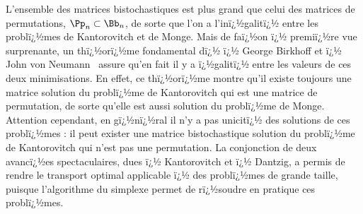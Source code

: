 
L'ensemble des matrices bistochastiques est plus grand que celui des matrices de permutations, $\Pp_n \subset \Bb_n$, de sorte que l'on a l'inï¿½galitï¿½ 
entre les problï¿½mes de Kantorovitch et de Monge. Mais de faï¿½on ï¿½ premiï¿½re vue surprenante, un thï¿½orï¿½me fondamental dï¿½ ï¿½ George Birkhoff et ï¿½ John von Neumann~\cite{birkhoff,von1953certain} assure qu'en fait il y a ï¿½galitï¿½ entre les valeurs de ces deux minimisations. En effet, ce thï¿½orï¿½me montre qu'il existe toujours une matrice solution du problï¿½me de Kantorovitch qui est une matrice de permutation, de sorte qu'elle est aussi solution du problï¿½me de Monge. Attention cependant, en gï¿½nï¿½ral il n'y a pas unicitï¿½ des solutions de ces problï¿½mes : il peut exister une matrice bistochastique solution du problï¿½me de Kantorovitch qui n'est pas une permutation. 
%
La conjonction de deux avancï¿½es spectaculaires, dues ï¿½ Kantorovitch et ï¿½ Dantzig, a permis de rendre le transport optimal applicable ï¿½ des problï¿½mes de grande taille, puisque l'algorithme du simplexe permet de rï¿½soudre en pratique ces problï¿½mes. 


